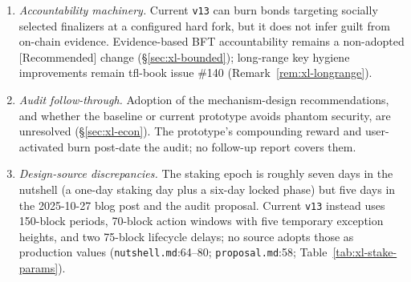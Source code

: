 \documentclass[11pt,a4paper]{article}
\theoremstyle{definition}
\begin{document}
\begin{enumerate}
  Quint spec or content in \texttt{quint-crosslink}.
\item \emph{Accountability machinery.} Current \texttt{v13} can burn
  bonds targeting socially selected finalizers at a configured hard fork,
  but it does not infer guilt from on-chain evidence. Evidence-based BFT
  accountability remains a non-adopted [Recommended] change
  (\S\ref{sec:xl-bounded}); long-range key hygiene improvements remain
  tfl-book issue \#140 (Remark~\ref{rem:xl-longrange}).
\item \emph{Audit follow-through.} Adoption of the mechanism-design
  recommendations, and whether the baseline or current prototype avoids
  phantom security, are unresolved (\S\ref{sec:xl-econ}). The prototype's
  compounding reward and user-activated burn post-date the audit; no
  follow-up report covers them.
\item \emph{Design-source discrepancies.} The staking epoch is roughly
  seven days in the nutshell (a one-day staking day plus a six-day locked
  phase) but five days in the 2025-10-27 blog post and the audit
  proposal. Current \texttt{v13} instead uses 150-block periods, 70-block
  action windows with five temporary exception heights, and two 75-block
  lifecycle delays; no source adopts
  those as production values (\texttt{nutshell.md}:64--80;
  \texttt{proposal.md}:58; Table~\ref{tab:xl-stake-params}).
\end{enumerate}
\end{document}
